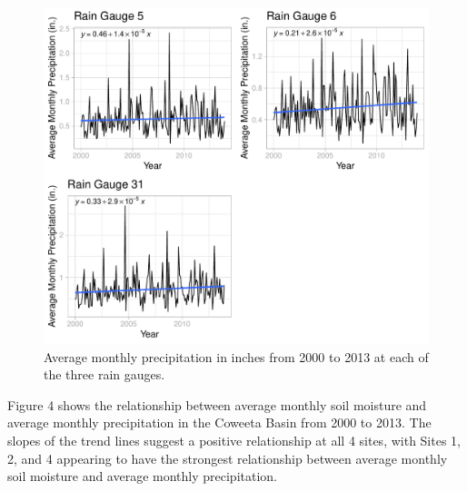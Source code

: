 \documentclass[
  12pt,
]{article}
\begin{document}
\begin{figure}
\centering
\includegraphics{Project_Report_Davidson_McClaugherty_Zungailia_files/figure-latex/Average Monthly Precipitation Cowplot-1.pdf}
\caption{Average monthly precipitation in inches from 2000 to 2013 at
each of the three rain gauges.}
\end{figure}

\newpage

Figure 4 shows the relationship between average monthly soil moisture
and average monthly precipitation in the Coweeta Basin from 2000 to
2013. The slopes of the trend lines suggest a positive relationship at
all 4 sites, with Sites 1, 2, and 4 appearing to have the strongest
relationship between average monthly soil moisture and average monthly
precipitation.
\end{document}
